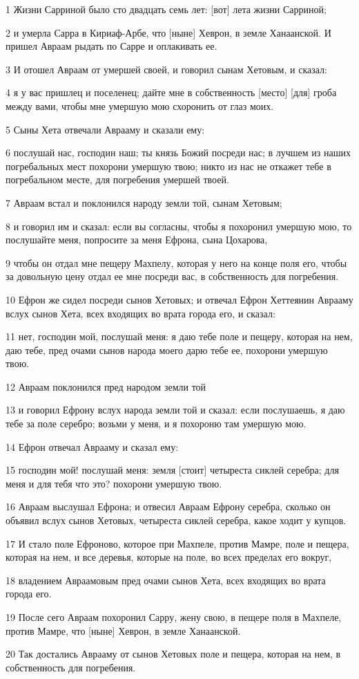 \par 1 Жизни Сарриной было сто двадцать семь лет: [вот] лета жизни Сарриной;
\par 2 и умерла Сарра в Кириаф-Арбе, что [ныне] Хеврон, в земле Ханаанской. И пришел Авраам рыдать по Сарре и оплакивать ее.
\par 3 И отошел Авраам от умершей своей, и говорил сынам Хетовым, и сказал:
\par 4 я у вас пришлец и поселенец; дайте мне в собственность [место] [для] гроба между вами, чтобы мне умершую мою схоронить от глаз моих.
\par 5 Сыны Хета отвечали Аврааму и сказали ему:
\par 6 послушай нас, господин наш; ты князь Божий посреди нас; в лучшем из наших погребальных мест похорони умершую твою; никто из нас не откажет тебе в погребальном месте, для погребения умершей твоей.
\par 7 Авраам встал и поклонился народу земли той, сынам Хетовым;
\par 8 и говорил им и сказал: если вы согласны, чтобы я похоронил умершую мою, то послушайте меня, попросите за меня Ефрона, сына Цохарова,
\par 9 чтобы он отдал мне пещеру Махпелу, которая у него на конце поля его, чтобы за довольную цену отдал ее мне посреди вас, в собственность для погребения.
\par 10 Ефрон же сидел посреди сынов Хетовых; и отвечал Ефрон Хеттеянин Аврааму вслух сынов Хета, всех входящих во врата города его, и сказал:
\par 11 нет, господин мой, послушай меня: я даю тебе поле и пещеру, которая на нем, даю тебе, пред очами сынов народа моего дарю тебе ее, похорони умершую твою.
\par 12 Авраам поклонился пред народом земли той
\par 13 и говорил Ефрону вслух народа земли той и сказал: если послушаешь, я даю тебе за поле серебро; возьми у меня, и я похороню там умершую мою.
\par 14 Ефрон отвечал Аврааму и сказал ему:
\par 15 господин мой! послушай меня: земля [стоит] четыреста сиклей серебра; для меня и для тебя что это? похорони умершую твою.
\par 16 Авраам выслушал Ефрона; и отвесил Авраам Ефрону серебра, сколько он объявил вслух сынов Хетовых, четыреста сиклей серебра, какое ходит у купцов.
\par 17 И стало поле Ефроново, которое при Махпеле, против Мамре, поле и пещера, которая на нем, и все деревья, которые на поле, во всех пределах его вокруг,
\par 18 владением Авраамовым пред очами сынов Хета, всех входящих во врата города его.
\par 19 После сего Авраам похоронил Сарру, жену свою, в пещере поля в Махпеле, против Мамре, что [ныне] Хеврон, в земле Ханаанской.
\par 20 Так достались Аврааму от сынов Хетовых поле и пещера, которая на нем, в собственность для погребения.

